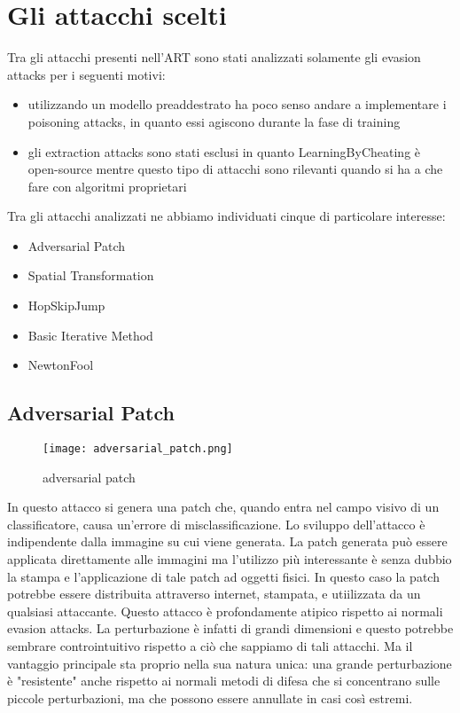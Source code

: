 \section{Gli attacchi scelti}
Tra gli attacchi presenti nell'ART sono stati analizzati solamente gli evasion attacks per i seguenti motivi:\begin{itemize}
    \item utilizzando un modello preaddestrato ha poco senso andare a implementare i poisoning attacks, in quanto essi agiscono durante la fase di training
    \item gli extraction attacks sono stati esclusi in quanto LearningByCheating è open-source mentre questo tipo di attacchi sono rilevanti quando si ha a che fare
    con algoritmi proprietari
\end{itemize}
Tra gli attacchi analizzati ne abbiamo individuati cinque di particolare interesse:\begin{itemize}
    \item Adversarial Patch
    \item Spatial Transformation
    \item HopSkipJump
    \item Basic Iterative Method
    \item NewtonFool 
\end{itemize}
\subsection{Adversarial Patch} 
\begin{figure}[h]
    \texttt{[image: adversarial\_patch.png]}
    \caption{adversarial patch}
    \label{fig:patch}
\end{figure}
\cite{patch} In questo attacco si genera una patch che, quando entra nel campo visivo di un classificatore, causa un'errore di misclassificazione. Lo sviluppo dell'attacco è 
indipendente dalla immagine su cui viene generata. La patch generata può essere applicata direttamente alle immagini ma l'utilizzo più interessante è senza dubbio la stampa e l'applicazione di tale patch
ad oggetti fisici. In questo caso la patch potrebbe essere distribuita attraverso internet, stampata, e utiilizzata da un qualsiasi attaccante. Questo attacco è profondamente atipico rispetto
ai normali evasion attacks. La perturbazione è infatti di grandi dimensioni e questo potrebbe sembrare controintuitivo rispetto a ciò che sappiamo di tali attacchi. Ma il vantaggio principale
sta proprio nella sua natura unica: una grande perturbazione è "resistente" anche rispetto ai normali metodi di difesa che si concentrano sulle piccole perturbazioni, ma che possono essere annullate in 
casi così estremi.
